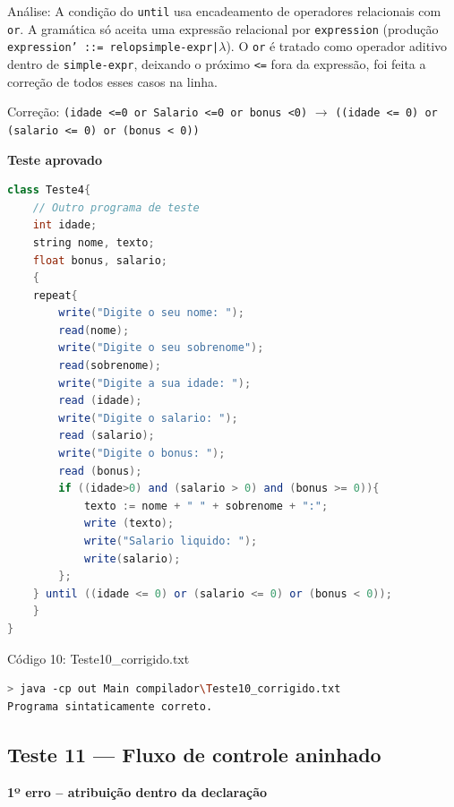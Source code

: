 \documentclass[12pt,a4paper]{article}
\begin{document}
Análise: A condição do \texttt{until} usa encadeamento de operadores relacionais com \texttt{or}. A gramática só aceita uma expressão relacional por \texttt{expression} (produção \texttt{expression' ::= relop\;simple-expr\;|\;$\lambda$}). O \texttt{or} é tratado como operador aditivo dentro de \texttt{simple-expr}, deixando o próximo \texttt{<=} fora da expressão, foi feita a correção de todos esses casos na linha.

Correção: \texttt{(idade <=0 or Salario <=0 or bonus <0)} $\to$ \texttt{((idade <= 0) or (salario <= 0) or (bonus < 0))}

\textbf{Teste aprovado}

\begin{lstlisting}[language=Java]
class Teste4{
    // Outro programa de teste
    int idade;
    string nome, texto;
    float bonus, salario;
    {
    repeat{
        write("Digite o seu nome: ");
        read(nome);
        write("Digite o seu sobrenome");
        read(sobrenome);
        write("Digite a sua idade: ");
        read (idade);
        write("Digite o salario: ");
        read (salario);
        write("Digite o bonus: ");
        read (bonus);
        if ((idade>0) and (salario > 0) and (bonus >= 0)){
            texto := nome + " " + sobrenome + ":";
            write (texto);
            write("Salario liquido: ");
            write(salario);
        };
    } until ((idade <= 0) or (salario <= 0) or (bonus < 0));
    }
}
\end{lstlisting}

Código 10: Teste10\_corrigido.txt

\begin{lstlisting}[language=bash]
> java -cp out Main compilador\Teste10_corrigido.txt
Programa sintaticamente correto.
\end{lstlisting}

\subsection{Teste 11 --- Fluxo de controle aninhado}

\textbf{1º erro -- atribuição dentro da declaração}
\end{document}
